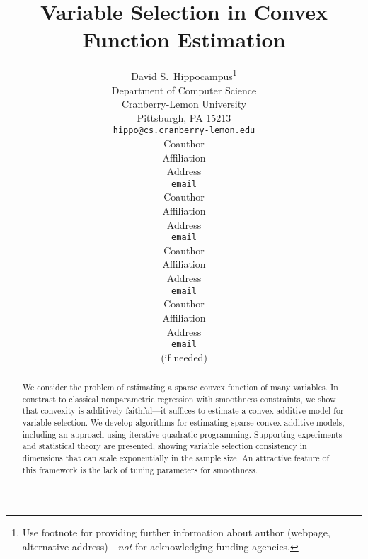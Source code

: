 \documentclass[pdftex]{article}
\title{Variable Selection in Convex Function Estimation}
\author{
David S.~Hippocampus\thanks{ Use footnote for providing further information
about author (webpage, alternative address)---\emph{not} for acknowledging
funding agencies.} \\
Department of Computer Science\\
Cranberry-Lemon University\\
Pittsburgh, PA 15213 \\
\texttt{hippo@cs.cranberry-lemon.edu} \\
\And
Coauthor \\
Affiliation \\
Address \\
\texttt{email} \\
\AND
Coauthor \\
Affiliation \\
Address \\
\texttt{email} \\
\And
Coauthor \\
Affiliation \\
Address \\
\texttt{email} \\
\And
Coauthor \\
Affiliation \\
Address \\
\texttt{email} \\
(if needed)\\
}
\DeclareMathOperator{\rank}{rank}
\DeclareMathOperator{\diag}{diag}
\numberwithin{equation}{section}
\theoremstyle{plain}
\theoremstyle{remark}
\begin{document}
\def\X{\mathcal{X}}
\def\comma{\unskip,~}
\def\truep{p^*}
\def\div{\|\,}
\long{}
\def\reals{{\mathbb R}}
\def\P{{\mathbb P}}
\def\E{{\mathbb E}}
\def\Cov{\mathop{\text{Cov}}}
\def\supp{\mathop{\text{supp}\kern.2ex}}
\def\argmin{\mathop{\text{\rm arg\,min}}}
\def\arginf{\mathop{\text{\rm arg\,inf}}}
\def\argmax{\mathop{\text{\rm arg\,max}}}
\let\tilde\widetilde
\def\csd{${}^*$}
\def\mld{${}^\dag$}
\def\dos{${}^\ddag$}
\def\W{\widetilde Y}
\def\Z{\widetilde X}
\let\hat\widehat
\let\tilde\widetilde
\def\given{{\,|\,}}
\def\ds{\displaystyle}
\def\bs{\backslash}
\def\1{{(1)}}
\def\2{{(2)}}
\def\pn{{(n)}}
\def\ip{{(i)}}
\def\Xbar{\overline{X}}
\def\except{\backslash}
\def\npn{\mathop{\textit{NPN\,}}}
\def\i{{(i)}}
\def\cE{{\mathcal{C}}}
\def\cM{{\mathcal{M}}}
\def\cF{{\mathcal{F}}}
\def\cP{{\mathcal{P}}}
\def\cG{{\mathcal{G}}}
\def\tr{\mathop{\text{tr}}}
\long{}
\def\ti#1{#1}
\def\titi#1{\textit{#1}}
\def\cram{{\sc cram}}
\def\spam{{\small\sc SpAM}}
\def\diag{\mathop{\rm diag}}
\def\ones{\mathbf{1}}
\def\threebars{\mbox{$|\kern-.25ex|\kern-.25ex|$}}
\def\fatnorm#1{\threebars #1 \threebars}
\def\rank{\mathop{\rm rank}}
\def\S{\mathcal{S}}
\def\H{\mathcal{H}}
\def\K{{K}}
\def\rank{\mathop{\rm rank}}
\def\half{{1/2}}
\def\Y{\mathbb{Y}}
\def\M{\mathbb{M}}
\def\F{\mathbb{F}}
\def\pinv{{-1}}
\def\Res{Z}
\def\Proj{P}
\def\cN{{\mathcal N}}
\def\cT{{\mathcal H}}
\def\coloneqq{:=}
\def\mathbf#1{\mbox{\boldmath $#1$}} 
\def\bar#1{\overline{#1}}

\maketitle

\begin{abstract}
  We consider the problem of estimating a sparse convex function of
  many variables.  In constrast to classical nonparametric
  regression with smoothness constraints, we show that convexity is
  additively faithful---it suffices to estimate a convex additive
  model for variable selection.  We develop algorithms for estimating
  sparse convex additive models, including an approach using iterative
  quadratic programming.  Supporting experiments and statistical
  theory are presented, showing variable selection consistency in
  dimensions that can scale exponentially in the sample size.  An
  attractive feature of this framework is the lack of tuning parameters
  for smoothness.
\end{abstract}
\vskip10pt


%








\clearpage



\newpage

\end{document}
